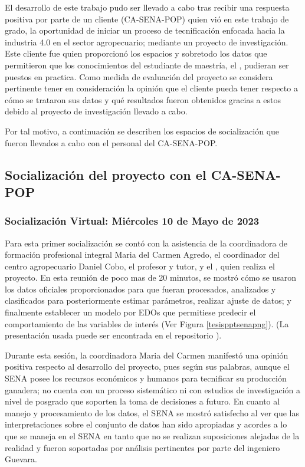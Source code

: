 El desarrollo de este trabajo pudo ser llevado a cabo tras recibir una respuesta positiva por parte de un cliente (CA-SENA-POP) quien vió en este trabajo de grado, la oportunidad de iniciar un proceso de tecnificación enfocada hacia la industria 4.0 en el sector agropecuario; mediante un proyecto de investigación. Este cliente fue quien proporcionó los espacios y sobretodo los datos que permitieron que los conocimientos del estudiante de maestría, el \authorA, pudieran ser puestos en practica. Como  medida de evaluación del proyecto se considera pertinente tener en consideración la opinión que el cliente pueda tener respecto a cómo se trataron sus datos y qué resultados fueron obtenidos gracias a estos debido al proyecto de investigación llevado a cabo.

Por tal motivo, a continuación se describen los espacios de socialización que fueron llevados a cabo con el personal del CA-SENA-POP.

\subsection{Socialización del proyecto con el CA-SENA-POP}
\subsubsection{Socialización Virtual: Miércoles 10 de Mayo de 2023}
Para esta primer socialización se contó con la asistencia de la coordinadora de formación profesional integral Maria del Carmen Agredo, el coordinador del centro agropecuario Daniel Cobo, el profesor y tutor, \director \hspace{0.1cm} y el \authorA, \hspace{0.1cm}quien realiza el proyecto. En esta reunión de poco mas de 20 minutos, se mostró cómo se usaron los datos oficiales proporcionados para que fueran procesados, analizados y clasificados para posteriormente estimar parámetros, realizar ajuste de datos; y finalmente establecer un modelo por EDOs que permitiese predecir el comportamiento de las variables de interés (Ver Figura \ref{tesispptsenapng}). (La presentación usada puede ser encontrada en el repositorio \cite{msclfggrepo}).

Durante esta sesión, la coordinadora Maria del Carmen manifestó una opinión positiva respecto al desarrollo del proyecto, pues según sus palabras, aunque el SENA posee los recursos económicos y humanos para tecnificar su producción ganadera; no cuenta con un proceso sistemático ni con estudios de investigación a nivel de posgrado que soporten la toma de decisiones a futuro.
En cuanto al manejo y procesamiento de los datos, el SENA se mostró satisfecho al ver que las interpretaciones sobre el conjunto de datos han sido apropiadas y acordes a lo que se maneja en el SENA en tanto que no se realizan suposiciones alejadas de la realidad y fueron soportadas por análisis pertinentes por parte del ingeniero Guevara.

